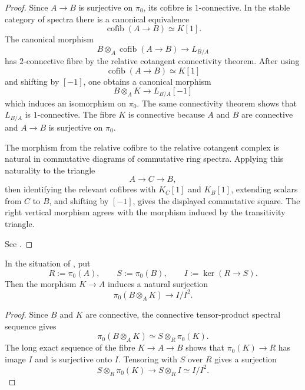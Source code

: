 \begin{proof}
Since \(A\to B\) is surjective on \(\pi_0\), its cofibre is
\(1\)-connective. In the stable category of spectra there is a canonical
equivalence
\[
    \operatorname{cofib}(A\to B)
    \simeq
    K[1].
\]
The canonical morphism
\[
    B\otimes_A
    \operatorname{cofib}(A\to B)
    \longrightarrow
    L_{B/A}
\]
has \(2\)-connective fibre by the relative cotangent connectivity
theorem. After using
\[
    \operatorname{cofib}(A\to B)
    \simeq
    K[1]
\]
and shifting by \([-1]\), one obtains a canonical morphism
\[
    B\otimes_AK
    \longrightarrow
    L_{B/A}[-1]
\]
which induces an isomorphism on \(\pi_0\). The same connectivity theorem
shows that \(L_{B/A}\) is \(1\)-connective. The fibre \(K\) is connective
because \(A\) and \(B\) are connective and \(A\to B\) is surjective on
\(\pi_0\).

The morphism from the relative cofibre to the relative cotangent complex
is natural in commutative diagrams of commutative ring spectra. Applying
this naturality to the triangle
\[
    A
    \longrightarrow
    C
    \longrightarrow
    B,
\]
then identifying the relevant cofibres with \(K_C[1]\) and \(K_B[1]\),
extending scalars from \(C\) to \(B\), and shifting by \([-1]\), gives
the displayed commutative square. The right vertical morphism agrees
with the morphism induced by the transitivity triangle.

See
\cite[Theorem~7.4.3.1 and Corollary~7.4.3.2]{LurieHigherAlgebra}.
\end{proof}

\begin{lemma}
\label{lem:derived-conormal-classical-quotient}
In the situation of , put
\[
    R:=\pi_0(A),
    \qquad
    S:=\pi_0(B),
    \qquad
    I:=\ker(R\to S).
\]
Then the morphism $K\to A$ induces a natural surjection
\[
    \pi_0(B\otimes_AK)
    \longrightarrow
    I/I^2.
\]
\end{lemma}

\begin{proof}
Since $B$ and $K$ are connective, the connective tensor-product spectral
sequence gives
\[
    \pi_0(B\otimes_AK)
    \simeq
    S\otimes_R\pi_0(K).
\]
The long exact sequence of the fibre $K\to A\to B$ shows that
$\pi_0(K)\to R$ has image $I$ and is surjective onto $I$. Tensoring
with $S$ over $R$ gives a surjection
\[
    S\otimes_R\pi_0(K)
    \longrightarrow
    S\otimes_RI
    \simeq
    I/I^2.
\]
\end{proof}

